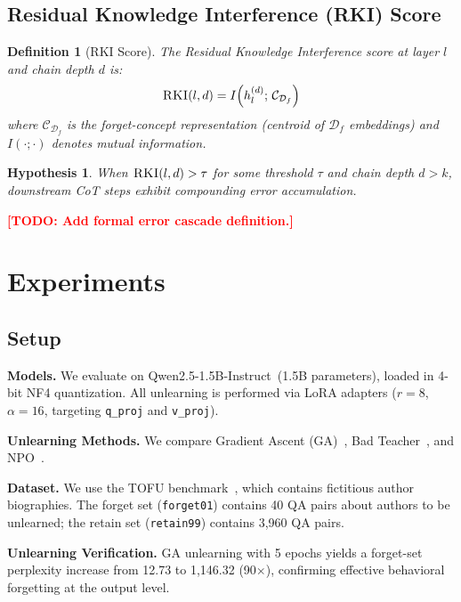 \documentclass[letterpaper]{article}
\newtheorem{definition}{Definition}
\newtheorem{hypothesis}{Hypothesis}
\newcommand{\rki}{\textsc{RKI}}
\newcommand{\forget}{\mathcal{D}_f}
\newcommand{\TODO}[1]{\textcolor{red}{\textbf{[TODO: #1]}}}
\begin{document}
\subsection{Residual Knowledge Interference (\rki) Score}
\begin{definition}[\rki{} Score]
The Residual Knowledge Interference score at layer $l$ and chain depth $d$ is:
\begin{equation}
    \rki(l, d) = I\!\left(h_l^{(d)};\, \mathcal{C}_{\forget}\right)
    \label{eq:rki}
\end{equation}
where $\mathcal{C}_{\forget}$ is the forget-concept representation
(centroid of $\forget$ embeddings) and $I(\cdot;\cdot)$ denotes mutual information.
\end{definition}

\begin{hypothesis}
When $\rki(l, d) > \tau$ for some threshold $\tau$ and chain depth $d > k$,
downstream CoT steps exhibit compounding error accumulation.
\end{hypothesis}

\TODO{Add formal error cascade definition.}

\section{Experiments}
\label{sec:experiments}

\subsection{Setup}
\textbf{Models.} We evaluate on Qwen2.5-1.5B-Instruct~(1.5B parameters),
loaded in 4-bit NF4 quantization. All unlearning is performed via LoRA adapters
($r{=}8$, $\alpha{=}16$, targeting \texttt{q\_proj} and \texttt{v\_proj}).

\textbf{Unlearning Methods.} We compare Gradient Ascent (GA)~\cite{thudi2022unrolling},
Bad Teacher~\cite{chundawat2023bad}, and NPO~\cite{zhang2024npo}.

\textbf{Dataset.} We use the TOFU benchmark~\cite{maini2024tofu}, which contains
fictitious author biographies. The forget set (\texttt{forget01}) contains 40 QA pairs
about authors to be unlearned; the retain set (\texttt{retain99}) contains 3{,}960 QA pairs.

\textbf{Unlearning Verification.} GA unlearning with 5 epochs yields a forget-set
perplexity increase from 12.73 to 1{,}146.32 (90$\times$), confirming effective
behavioral forgetting at the output level.
\end{document}
